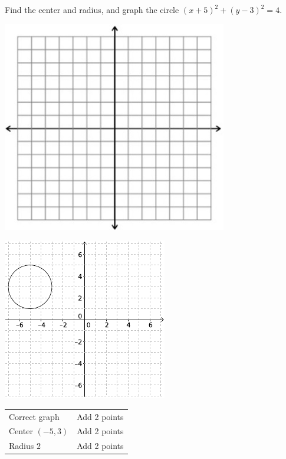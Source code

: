 {
	Find the center and radius, and graph the circle $(x+5)^2+(y-3)^2=4$.\begin{onlyproblem}\begin{center}\includegraphics{fig-graphpaper.png}\end{center}\end{onlyproblem} \begin{onlysolution}\begin{center}\includegraphics{fig100-20-d-answer}\end{center}\end{onlysolution}
}
{
	\begin{tabular}{l l}
	Correct graph & Add 2 points\\
	Center $(-5, 3)$ & Add 2 points\\
	Radius $2$ & Add 2 points
	\end{tabular}
}

